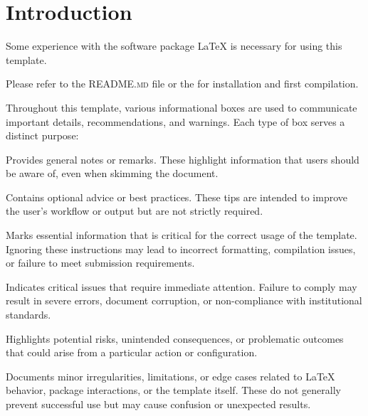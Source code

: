 \chapter{Introduction} %

Some experience with the software package {\LaTeX} is necessary for using this template.

Please refer to the \textsc{README.md} file or the  for installation and first compilation.

Throughout this template, various informational boxes are used to communicate important details, recommendations, and warnings. Each type of box serves a distinct purpose:

\begin{notebox}
    Provides general notes or remarks. These highlight information that users should be aware of, even when skimming the document.
\end{notebox}

\begin{tipbox}
    Contains optional advice or best practices. These tips are intended to improve the user’s workflow or output but are not strictly required.
\end{tipbox}

\begin{importantbox}
    Marks essential information that is critical for the correct usage of the template. Ignoring these instructions may lead to incorrect formatting, compilation issues, or failure to meet submission requirements.
\end{importantbox}

\begin{dangerbox}
    Indicates critical issues that require immediate attention. Failure to comply may result in severe errors, document corruption, or non-compliance with institutional standards.
\end{dangerbox}

\begin{warningbox}
    Highlights potential risks, unintended consequences, or problematic outcomes that could arise from a particular action or configuration.
\end{warningbox}

\begin{quirkbox}
    Documents minor irregularities, limitations, or edge cases related to LaTeX behavior, package interactions, or the template itself. These do not generally prevent successful use but may cause confusion or unexpected results.
\end{quirkbox}


